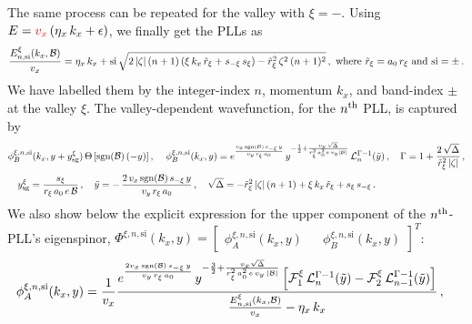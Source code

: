 \documentclass[aps,prb, onecolumn, nofootinbib, citeautoscript,10pt]{revtex4-2}
\def \nn{\nonumber \\}
\begin{document}
\begin{widetext}
The same process can be repeated for the valley with $\xi =- $. Using $E= \textcolor{red}{v_x} \left (  \eta_x \,   k_x + \epsilon   \right ) $, we finally get the PLLs as
\begin{align}
\frac{  E^{\xi}_{n, \rm{si}} (k_x, \mathcal B) } {v_x} =  
\eta_x \,   k_x + \text{si} \,\sqrt{ 2\,|\zeta|\,(n+1) \left (\xi\,k_x \, \tilde r_\xi + s_{-\xi} \, s_\xi \right ) - \tilde r_\xi^2 \, \zeta^2\,(n+1)^2 }  \,,
\text{ where } \tilde{r}_\xi = a_0 \, r_\xi \text{ and } \text{si} =\pm\,.
\end{align}
We have labelled them by the integer-index $n$, momentum $k_x$, and band-index $\pm$ at the valley $\xi$. The valley-dependent wavefunction, for the $n^{\rm th}$ PLL, is captured by
\begin{align}
& \phi_B^{\xi,n, \text{si}} (k_x, y+ y^\xi_{\rm sg}) \, \Theta \left[ \text{sgn}(\mathcal B ) \left(- y\right)  \right],\,
\quad
 \phi_B^{\xi, n, \text{si}} (k_x, y) = e^{\frac{ v_x \, \text{sgn} (\mathcal B) \,s_{- \xi}\, y} { v_y \, r_\xi\, a_0 }} \, 
y^{-\frac{1}{2}+{\frac{ v_x \,\sqrt{\Delta}}{ r_\xi^2\, a_0^2\, e  \, v_y  \left |{\mathcal B}  \right |}}} \, 
{\mathcal L}^{\Gamma-1}_{n}(\tilde y)\,, 
\quad  \Gamma = 1+ \frac{2 \,\sqrt{\Delta }}{\tilde  r_\xi^2 \, |\zeta|} \,,\nn
& \quad  y^\xi_{\rm sg} = \frac{s_\xi } {r_\xi \,a_0\,  e\, {\mathcal B}}\,,\quad
\tilde y = -\, \frac{ 2\, v_x \, \text{sgn} (\mathcal B) \,s_{-\xi}\, y} 
{ v_y \,r_\xi \, a_0 }\,, \quad
\sqrt{\Delta}=-{\tilde r}_\xi^2 \, |\zeta |\, (n+1) + \xi\,k_x \, {\tilde r}_\xi + s_{\xi} \, s_{-\xi} \,.
\end{align}
We also show below the explicit expression for the upper component of the $n^{\rm th}$-PLL's eigenspinor, $ \Phi^{\xi, n, \text{si}} (k_x, y) = \begin{bmatrix}
\phi_A^{\xi, n, \text{si}}  (k_x, y) && \phi_B^{\xi, n, \text{si}}  (k_x, y)  \end{bmatrix}^T $:
\begin{align}
\label{eqphia}
& \phi_A^{\xi, n, \text{si}} (k_x, y)  =  \frac{1}{v_x} \frac{
e^{\frac{2v_x \,\mathrm{sgn}(\mathcal{B})\, s_{-\xi}\, y}{v_y\, r_\xi\, a_0}}
\, y^{-\frac{3}{2} + 
\frac{v_x \sqrt{\Delta}}{r_{\xi}^2\, a_0^2\, e\, v_y\, \left|\mathcal{B}\right|}}
\left[
{\mathcal{F}}_1^\xi\,\mathcal{L}_{n}^{\Gamma-1}(\tilde{y})
-
{\mathcal{F}}_2^\xi \,\mathcal{L}_{n-1}^{\Gamma-1}(\tilde{y})\right]}
{ \frac{ E^{\xi}_{n, \rm{si}} (k_x, \mathcal B)} {v_x} - \eta_x \,   k_x }\,,

\end{align}
\end{widetext}
\end{document}
